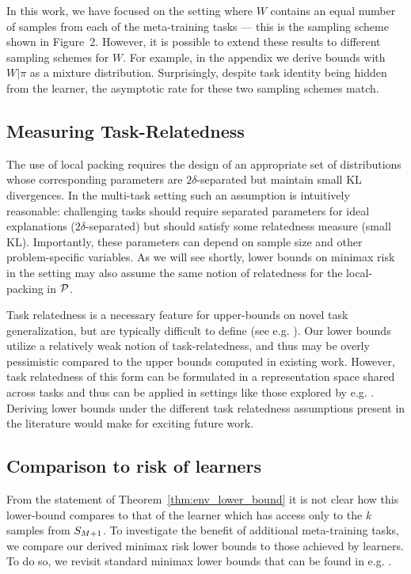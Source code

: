 In this work, we have focused on the setting where $W$ contains an equal number of samples from each of the meta-training tasks --- this is the sampling scheme shown in Figure~2. However, it is possible to extend these results to different sampling schemes for $W$. For example, in the appendix we derive bounds with $W|\pi$ as a mixture distribution. Surprisingly, despite task identity being hidden from the learner, the asymptotic rate for these two sampling schemes match.

\subsection{Measuring Task-Relatedness}

The use of local packing requires the design of an appropriate set of distributions whose corresponding parameters are $2\delta$-separated but maintain small KL divergences. In the multi-task setting such an assumption is intuitively reasonable: challenging tasks should require separated parameters for ideal explanations ($2\delta$-separated) but should satisfy some relatedness measure (small KL). Importantly, these parameters can depend on sample size and other problem-specific variables. As we will see shortly, lower bounds on minimax risk in the \iid setting may also assume the same notion of relatedness for the local-packing in $\mathcal{P}$.

Task relatedness is a necessary feature for upper-bounds on novel task generalization, but are typically difficult to define (see e.g. \citet{ben2008notion}). Our lower bounds utilize a relatively weak notion of task-relatedness, and thus may be overly pessimistic compared to the upper bounds computed in existing work. However, task relatedness of this form can be formulated in a representation space shared across tasks and thus can be applied in settings like those explored by e.g. \citet{du2020few}. Deriving lower bounds under the different task relatedness assumptions present in the literature would make for exciting future work.

\subsection{Comparison to risk of \iid learners}

From the statement of Theorem~\ref{thm:env_lower_bound} it is not clear how this lower-bound compares to that of the \iid learner which has access only to the $k$ samples from $S_{M+1}$.
To investigate the benefit of additional meta-training tasks, we compare our derived minimax risk lower bounds to those achieved by \iid learners. To do so, we revisit standard minimax lower bounds that can be found in e.g. \citet{loh2017lower}. 

